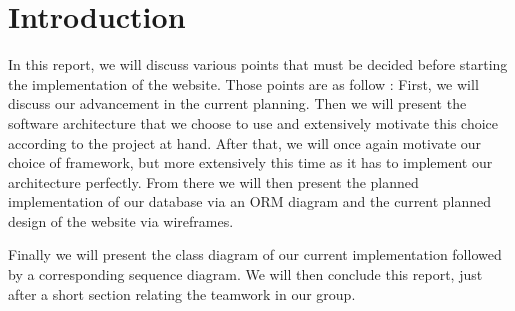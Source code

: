 
\section{Introduction}

In this report, we will discuss various points that must be decided before
starting the implementation of the website. Those points are as follow :
First, we will discuss our advancement in the current planning. Then we will present the software architecture that we choose to use and extensively motivate this choice according to the project at hand. After that, we will once again motivate our choice of framework, but more
extensively this time as it has to implement our architecture perfectly. From there we will then present the planned implementation of our database via an ORM diagram and the current planned design of the website via wireframes. \newline

Finally we will present the class diagram of our current implementation followed by a corresponding sequence diagram. We will then conclude this report, just after a short section relating the teamwork in our group.
